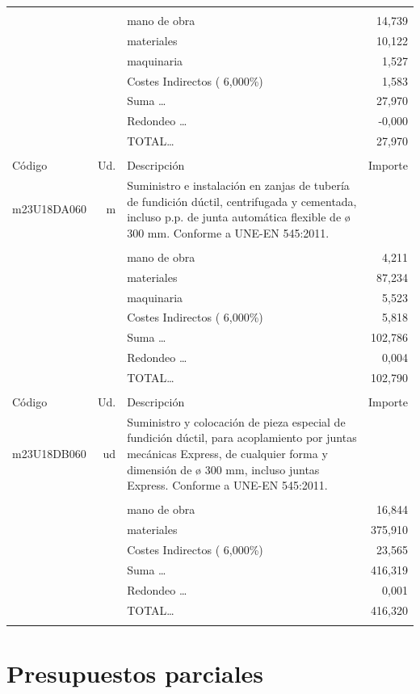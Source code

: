 \begin{supertabular}{l r p{60mm} r}
&&&\\%
&&mano de obra&    14,739\\%
&&materiales&    10,122\\%
&&maquinaria&     1,527\\%
&&Costes Indirectos (     6,000\%)&     1,583\\%
&&Suma \ldots&    27,970\\%
&&Redondeo \ldots&    {-}0,000\\%
%
&&TOTAL\ldots&    27,970\\%
&&&\\%
Código&Ud.&Descripción&Importe\\%
\hline%
m23U18DA060&m&Suministro e instalación en zanjas de tubería de fundición dúctil, centrifugada y cementada, incluso p.p. de junta automática flexible de ø 300 mm. Conforme a UNE{-}EN 545:2011.&\\%
&&&\\%
&&mano de obra&     4,211\\%
&&materiales&    87,234\\%
&&maquinaria&     5,523\\%
&&Costes Indirectos (     6,000\%)&     5,818\\%
&&Suma \ldots&   102,786\\%
&&Redondeo \ldots&     0,004\\%
%
&&TOTAL\ldots&   102,790\\%
&&&\\%
Código&Ud.&Descripción&Importe\\%
\hline%
m23U18DB060&ud&Suministro y colocación de pieza especial de fundición dúctil, para acoplamiento por juntas mecánicas Express, de cualquier forma y dimensión de ø 300 mm, incluso juntas Express. Conforme a UNE{-}EN 545:2011.&\\%
&&&\\%
&&mano de obra&    16,844\\%
&&materiales&   375,910\\%
&&Costes Indirectos (     6,000\%)&    23,565\\%
&&Suma \ldots&   416,319\\%
&&Redondeo \ldots&     0,001\\%
%
&&TOTAL\ldots&   416,320\\%
&&&\\%
\end{supertabular}%
\normalsize%


%
\part{Presupuestos parciales}%
